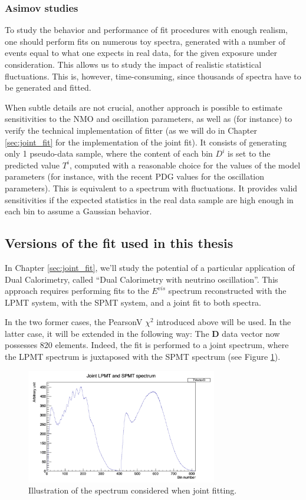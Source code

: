 \documentclass[../main.tex]{subfiles}
\begin{document}
\subsubsection{Asimov studies}
\label{sec:juno:Fit:asimov}

To study the behavior and performance of fit procedures with enough realism, one should perform fits on numerous toy spectra, generated with a number of events equal to what one expects in real data, for the given exposure under consideration. This allows us to study the impact of realistic statistical fluctuations. This is, however, time-consuming, since thousands of spectra have to be generated and fitted.

When subtle details are not crucial, another approach is possible to estimate sensitivities to the NMO and oscillation parameters, as well as (for instance) to verify the technical implementation of fitter (as we will do in Chapter \ref{sec:joint_fit} for the implementation of the joint fit). It consists of generating only 1 pseudo-data sample, where the content of each bin $D^i$ is set to the predicted value $T^i$, computed with a reasonable choice for the values of the model parameters (for instance, with the recent PDG values for the oscillation parameters). This is equivalent to a spectrum with fluctuations. It provides valid sensitivities if the expected statistics in the real data sample are high enough in each bin to assume a Gaussian behavior.

\subsection{Versions of the fit used in this thesis}

In Chapter \ref{sec:joint_fit}, we'll study the potential of a particular application of Dual Calorimetry, called ``Dual Calorimetry with neutrino oscillation''. This approach requires performing fits to the $E^{vis}$ spectrum reconstructed with the LPMT system, with the SPMT system, and a joint fit to both spectra.

In the two former cases, the PearsonV $\chi^2$ introduced above will be used. In the latter case, it will be extended in the following way: The $\bm{D}$ data vector now possesses 820 elements. Indeed, the fit is performed to a joint spectrum, where the LPMT spectrum is juxtaposed with the SPMT spectrum (see Figure \ref{fig:juno:joint_fit_spec}).

\begin{figure}[ht]
  \centering
  \includegraphics[height=5cm]{images/juno/joint_fit.png}
  \caption{Illustration of the spectrum considered when joint fitting.}
  \label{fig:juno:joint_fit_spec}
\end{figure}
\end{document}
